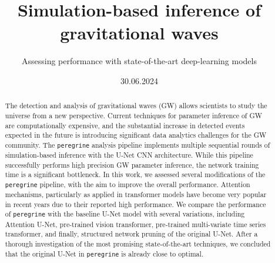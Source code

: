 \documentclass[ds,nofirstcompanypicture,nolinenumbering]{mscthesis}
\title{Simulation-based inference of gravitational waves}
\subtitle{Assessing performance with state-of-the-art deep-learning models}
\date{30.06.2024}
\begin{document}
\pagestyle{plain}

\maketitlepage
\fixemptypage
\setcounter{page}{1}

\begin{abstract}

The detection and analysis of gravitational waves (GW) allows scientists to study the universe from a new perspective. Current techniques for parameter inference of GW are computationally expensive, and the substantial increase in detected events expected in the future is introducing significant data analytics challenges for the GW community. The \texttt{peregrine} analysis pipeline implements multiple sequential rounds of simulation-based inference with the U-Net CNN architecture. While this pipeline successfully performs high precision GW parameter inference, the network training time is a significant bottleneck.
In this work, we assessed several modifications of the \texttt{peregrine} pipeline, with the aim to improve the overall performance. Attention mechanisms, particularly as applied in transformer models have become very popular in recent years due to their reported high performance. We compare the performance of \texttt{peregrine} with the baseline U-Net model with several variations, including Attention U-Net, pre-trained vision transformer, pre-trained multi-variate time series transformer, and finally, structured network pruning of the original U-Net. After a thorough investigation of the most promising state-of-the-art techniques, we concluded that the original U-Net in \texttt{peregrine} is already close to optimal.



\end{abstract}

\maketitle

\end{document}
